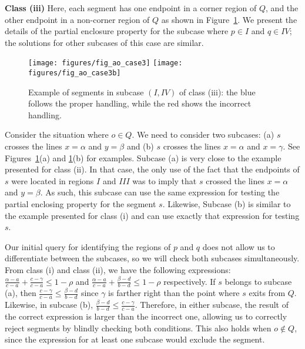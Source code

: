 {\bf Class (iii)}
Here, each segment has one endpoint in a corner region of $Q$, 
and the other endpoint in a non-corner region of $Q$ as shown in 
Figure~\ref{fig:rectangles:ao:case3}. We present the details of the partial 
enclosure property for the subcase where $p \in I$ and $q \in IV$; the 
solutions for other subcases of this case are similar.

\begin{figure}[t]
\begin{center}
  \texttt{[image: figures/fig\_ao\_case3]}
  \hspace{1.0em}
  \texttt{[image: figures/fig\_ao\_case3b]}
  \caption{Example of segments in  subcase $(I, IV)$ of class 
  (iii): the blue follows the proper handling, while the red shows the 
  incorrect handling.}
  \label{fig:rectangles:ao:case3}
\end{center}
\end{figure}

Consider the situation where $o \in Q$. We need to consider two 
subcases: (a) $s$ crosses the lines $x=\alpha$ and $y=\beta$ and 
(b) $s$ crosses the lines $x=\alpha$ and $x=\gamma$. See 
Figures~\ref{fig:rectangles:ao:case3}(a) and 
\ref{fig:rectangles:ao:case3}(b) for examples. Subcase (a) is very 
close to the example presented for class (ii). In that case, 
the only use of the fact that the endpoints of $s$ were located in 
regions $I$ and $III$ was to imply that $s$ crossed the lines 
$x=\alpha$ and $y=\beta$. As such, this subcase can use the same 
expression for testing the partial enclosing property for the segment 
$s$. Likewise, Subcase (b) is similar to the 
example presented for class (i) and can use exactly that expression 
for testing $s$.

Our initial query for identifying the regions of $p$ and $q$ does 
not allow us to differentiate between the subcases, so we will 
check both subcases simultaneously. From class (i) and class (ii), 
we have the following expressions:
$ \frac{\alpha - a}{c - a} + \frac{c - \gamma}{c - a} \leq 1 - \rho$
 and
$\frac{\alpha - a}{c - a} + \frac{\beta - d}{b - d} \leq 1 - \rho$
respectively. If $s$ belongs to subcase (a), then 
$\frac{c - \gamma}{c - a} \leq \frac{\beta - d}{b - d}$ since 
$\gamma$ is farther right than the point where $s$ exits from $Q$. 
Likewise, in subcase (b), 
$\frac{\beta - d}{b - d} \leq \frac{c - \gamma}{c - a}$.
Therefore, in either subcase, the result of the correct expression 
is larger than the incorrect one, allowing us to correctly reject 
segments by blindly checking both conditions. This also holds when 
$o \not \in Q$, since the expression for at least one subcase would 
exclude the segment.


